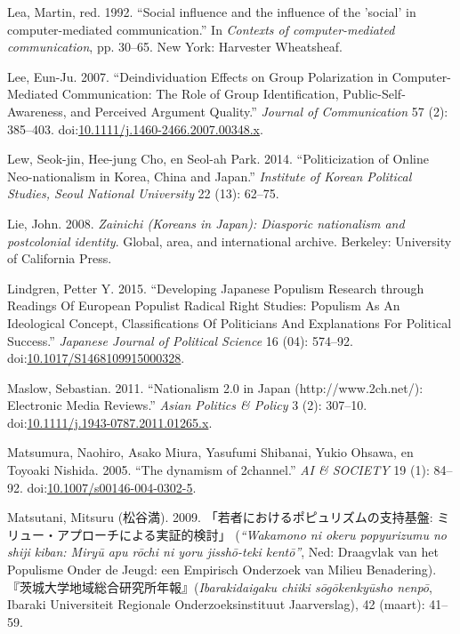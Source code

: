 \documentclass[10.5pt,dutch,]{article}
\begin{document}
\hypertarget{ref-leaux5fsocialux5f1992}{}
Lea, Martin, red. 1992. “Social influence and the influence of the
'social' in computer-mediated communication.”  In \emph{Contexts of
computer-mediated communication}, pp. 30--65. New York: Harvester
Wheatsheaf.

\hypertarget{ref-leeux5fdeindividuationux5f2007}{}
Lee, Eun-Ju. 2007. “Deindividuation Effects on Group Polarization in
Computer-Mediated Communication: The Role of Group Identification,
Public-Self-Awareness, and Perceived Argument Quality.” \emph{Journal of
Communication} 57 (2): 385--403.
doi:\href{https://doi.org/10.1111/j.1460-2466.2007.00348.x}{10.1111/j.1460-2466.2007.00348.x}.

\hypertarget{ref-lewux5fpoliticizationux5f2014}{}
Lew, Seok-jin, Hee-jung Cho, en Seol-ah Park. 2014. “Politicization of
Online Neo-nationalism in Korea, China and Japan.”  \emph{Institute of
Korean Political Studies, Seoul National University} 22 (13): 62--75.

\hypertarget{ref-lieux5fzainichiux5f2008}{}
Lie, John. 2008. \emph{Zainichi (Koreans in Japan): Diasporic
nationalism and postcolonial identity}. Global, area, and international
archive. Berkeley: University of California Press.

\hypertarget{ref-lindgrenux5fdevelopingux5f2015}{}
Lindgren, Petter Y. 2015. “Developing Japanese Populism Research through
Readings Of European Populist Radical Right Studies: Populism As An
Ideological Concept, Classifications Of Politicians And Explanations For
Political Success.” \emph{Japanese Journal of Political Science} 16 (04):
574--92.
doi:\href{https://doi.org/10.1017/S1468109915000328}{10.1017/S1468109915000328}.

\hypertarget{ref-maslowux5fnationalismux5f2011-1}{}
Maslow, Sebastian. 2011. “Nationalism 2.0 in Japan (http://www.2ch.net/):
Electronic Media Reviews.”  \emph{Asian Politics \& Policy} 3 (2):
307--10.
doi:\href{https://doi.org/10.1111/j.1943-0787.2011.01265.x}{10.1111/j.1943-0787.2011.01265.x}.

\hypertarget{ref-matsumuraux5fdynamismux5f2005}{}
Matsumura, Naohiro, Asako Miura, Yasufumi Shibanai, Yukio Ohsawa, en
Toyoaki Nishida. 2005. “The dynamism of 2channel.”  \emph{AI \& SOCIETY} 19
(1): 84--92.
doi:\href{https://doi.org/10.1007/s00146-004-0302-5}{10.1007/s00146-004-0302-5}.

\hypertarget{ref-matsutaniux5fwakamonoux5f2009}{}
Matsutani, Mitsuru (松谷満). 2009. 「若者におけるポピュリズムの支持基盤: ミリュー・アプローチによる実証的検討」 (\emph{“Wakamono ni okeru popyurizumu no shiji kiban: Miryū apu rōchi ni yoru jisshō-teki kentō”}, Ned: Draagvlak van het Populisme Onder de Jeugd: een Empirisch Onderzoek van Milieu Benadering).  『茨城大学地域総合研究所年報』(\emph{Ibarakidaigaku chiiki sōgōkenkyūsho nenpō}, Ibaraki Universiteit Regionale Onderzoeksinstituut Jaarverslag), 42 (maart): 41–59.
\end{document}
